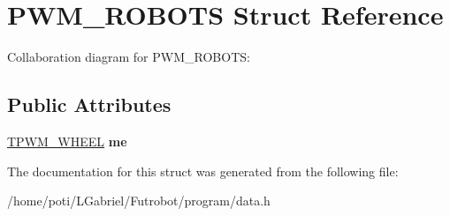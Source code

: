 \hypertarget{structPWM__ROBOTS}{}\section{P\+W\+M\+\_\+\+R\+O\+B\+O\+TS Struct Reference}
\label{structPWM__ROBOTS}


Collaboration diagram for P\+W\+M\+\_\+\+R\+O\+B\+O\+TS\+:
\subsection*{Public Attributes}
\begin{DoxyCompactItemize}
\item 
\hyperlink{structTPWM__WHEEL}{T\+P\+W\+M\+\_\+\+W\+H\+E\+EL} {\bfseries me}\hypertarget{structPWM__ROBOTS_a6146ca2b1fe1948791b0d8037ee29b54}{}\label{structPWM__ROBOTS_a6146ca2b1fe1948791b0d8037ee29b54}

\end{DoxyCompactItemize}


The documentation for this struct was generated from the following file\+:\begin{DoxyCompactItemize}
\item 
/home/poti/\+L\+Gabriel/\+Futrobot/program/data.\+h\end{DoxyCompactItemize}
